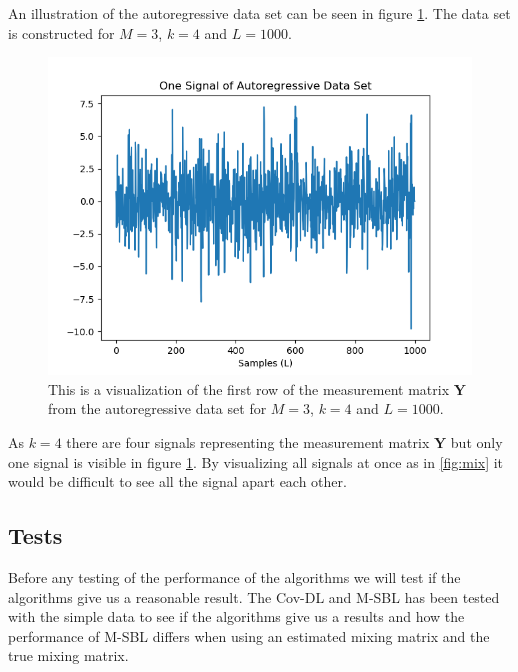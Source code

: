 An illustration of the autoregressive data set can be seen in figure \ref{fig:AR}. The data set is constructed for $M = 3$, $k = 4$ and $L = 1000$.
\begin{figure}[H]
\centering
\includegraphics[scale=0.5]{figures/chapter6/AR_Data_m3_n4_k4_L1000.png}
\caption{This is a visualization of the first row of the measurement matrix $\mathbf{Y}$ from the autoregressive data set for $M = 3$, $k=4$ and $L=1000$.}
\label{fig:AR}
\end{figure}
\noindent
As $k = 4$ there are four signals representing the measurement matrix $\mathbf{Y}$ but only one signal is visible in figure \ref{fig:AR}. By visualizing all signals at once as in \ref{fig:mix} it would be difficult to see all the signal apart each other.

\subsection{Tests}
Before any testing of the performance of the algorithms we will test if the algorithms give us a reasonable result. The Cov-DL and M-SBL has been tested with the simple data to see if the algorithms give us a results and how the performance of M-SBL differs when using an estimated mixing matrix and the true mixing matrix.

